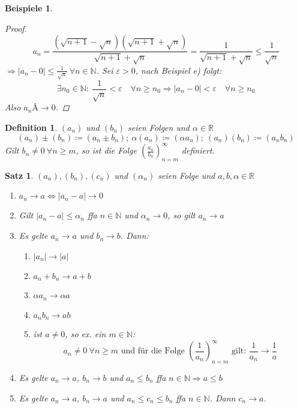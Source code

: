 \documentclass[titlepage,ngerman,a4paper,headsepline,DIV15,halfparskip*,14pt]{scrartcl}
\newcommand{\R}{\mathbb{R}}
\newcommand{\N}{\mathbb{N}}
\theoremstyle{dotless}
\newtheorem{satz}{Satz}[section]
\newtheorem*{definition}{Definition}
\newtheorem*{beispiele}{Beispiele}
\begin{document}
\begin{beispiele}
\begin{enumerate}
			\begin{proof}
				$$
					a_{n} = \frac{(\sqrt{n + 1} - \sqrt{n})(\sqrt{n + 1} + \sqrt{n})}{\sqrt{n + 1} + \sqrt{n}} = \frac{1}{\sqrt{n + 1} + \sqrt{n}} \leq \frac{1}{\sqrt{n}}
				$$
				$\Rightarrow |a_{n} - 0| \leq \frac{1}{\sqrt{n}} ~\forall n \in \N$. Sei $\varepsilon > 0$, nach Beispiel e) folgt:
				$$
					\exists n_{0} \in \N: ~ \frac{1}{\sqrt{n}} < \varepsilon \quad \forall n \geq n_{0} \Rightarrow |a_{n} - 0| < \varepsilon \quad \forall n \geq n_{0}
				$$
				Also $a_{n}Â \rightarrow 0$.
			\end{proof}
	\end{enumerate}
\end{beispiele}


\begin{definition}
	$(a_{n})$ und $(b_{n})$ seien Folgen und $\alpha \in \R$
	$$
		(a_{n}) \pm (b_{n}) \coloneqq (a_{n} \pm b_{n}); ~
		\alpha (a_{n}) \coloneqq (\alpha a_{n}); ~
		(a_{n}) (b_{n}) \coloneqq (a_{n} b_{n}) 		
	$$	
	Gilt $b_{n} \neq 0 ~\forall n \geq m$, so ist die Folge $\left( \frac{a_{n}}{b_{n}} \right)_{n = m}^{\infty}$ definiert.
\end{definition}


\begin{satz} \label{satz:2.2}
	$(a_{n}), (b_{n}), (c_{n})$ und $(\alpha_{n})$ seien Folge und $a, b, \alpha \in \R$

	\begin{enumerate}
		\item $a_{n} \rightarrow a \iff |a_{n} - a| \rightarrow 0$
		\item Gilt $|a_{n} - a| \leq \alpha_{n}$ ffa $n \in \N$ und $\alpha_{n} \rightarrow 0$, so gilt $a_{n} \rightarrow a$
		\item Es gelte $a_{n} \rightarrow a$ und $b_{n} \rightarrow b$. Dann:
			\begin{enumerate}
				\item $|a_{n}| \rightarrow |a|$ 
				\item $a_{n} + b_{n} \rightarrow a + b$
				\item $\alpha a_{n} \rightarrow \alpha a$
				\item $a_{n} b_{n} \rightarrow a b$
				\item ist $a \neq 0$, so ex. ein $m \in \N$:
					$$
						a_{n} \neq 0 ~\forall n \geq m \text{ und für die Folge } \left( \frac{1}{a_{n}} \right)_{n = m}^{\infty} \text{ gilt: } \frac{1}{a_{n}} \rightarrow \frac{1}{a}
					$$
			\end{enumerate}
		\item Es gelte $a_{n} \rightarrow a$, $b_{n} \rightarrow b$ und $a_{n} \leq b_{n}$ ffa $n \in \N \Rightarrow a \leq b$
		\item Es gelte $a_{n} \rightarrow a$, $b_{n} \rightarrow a$ und $a_{n} \leq c_{n} \leq b_{n}$ ffa $n \in \N$. Dann $c_{n} \rightarrow a$.
	\end{enumerate}
\end{satz}
\end{document}
